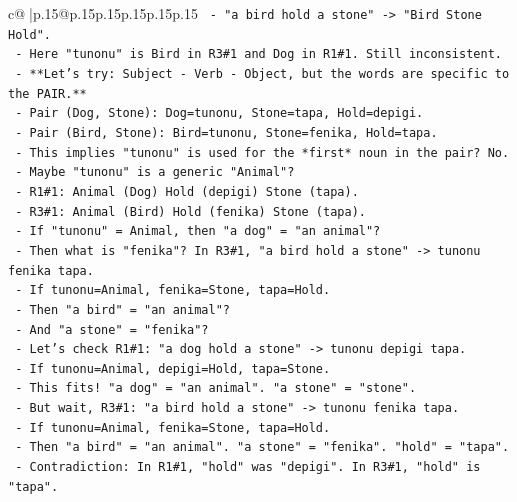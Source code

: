 \documentclass{article}
\begin{document}
{\begin{supertabular}{c@{$\;$}|p{.15\linewidth}@{}p{.15\linewidth}p{.15\linewidth}p{.15\linewidth}p{.15\linewidth}p{.15\linewidth}}
{{{\texttt{                  {-} "a bird hold a stone" {-}> "Bird Stone Hold".} \\
\texttt{                  {-} Here "tunonu" is Bird in R3\#1 and Dog in R1\#1. Still inconsistent.} \\
\texttt{      {-} **Let's try: Subject {-} Verb {-} Object, but the words are specific to the PAIR.**} \\
\texttt{        {-} Pair (Dog, Stone): Dog=tunonu, Stone=tapa, Hold=depigi.} \\
\texttt{        {-} Pair (Bird, Stone): Bird=tunonu, Stone=fenika, Hold=tapa.} \\
\texttt{          {-} This implies "tunonu" is used for the *first* noun in the pair? No.} \\
\texttt{          {-} Maybe "tunonu" is a generic "Animal"?} \\
\texttt{            {-} R1\#1: Animal (Dog) Hold (depigi) Stone (tapa).} \\
\texttt{            {-} R3\#1: Animal (Bird) Hold (fenika) Stone (tapa).} \\
\texttt{            {-} If "tunonu" = Animal, then "a dog" = "an animal"?} \\
\texttt{            {-} Then what is "fenika"? In R3\#1, "a bird hold a stone" {-}> tunonu fenika tapa.} \\
\texttt{              {-} If tunonu=Animal, fenika=Stone, tapa=Hold.} \\
\texttt{              {-} Then "a bird" = "an animal"?} \\
\texttt{              {-} And "a stone" = "fenika"?} \\
\texttt{              {-} Let's check R1\#1: "a dog hold a stone" {-}> tunonu depigi tapa.} \\
\texttt{                {-} If tunonu=Animal, depigi=Hold, tapa=Stone.} \\
\texttt{                {-} This fits! "a dog" = "an animal". "a stone" = "stone".} \\
\texttt{                {-} But wait, R3\#1: "a bird hold a stone" {-}> tunonu fenika tapa.} \\
\texttt{                  {-} If tunonu=Animal, fenika=Stone, tapa=Hold.} \\
\texttt{                  {-} Then "a bird" = "an animal". "a stone" = "fenika". "hold" = "tapa".} \\
\texttt{                  {-} Contradiction: In R1\#1, "hold" was "depigi". In R3\#1, "hold" is "tapa".} \\
}}}
\end{supertabular}}
\end{document}
